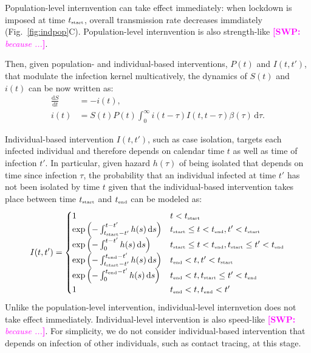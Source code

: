\documentclass[12pt]{article}
\newcommand{\comment}{\showcomment}
\newcommand{\showcomment}[3]{\textcolor{#1}{\textbf{[#2: }\textsl{#3}\textbf{]}}}
\newcommand{\swp}[1]{\comment{magenta}{SWP}{#1}}
\newcommand{\fref}[1]{Fig.~\ref{fig:#1}}
\newcommand{\tsub}[2]{#1_{{\textrm{\tiny #2}}}}
\newcommand{\dd}[1]{\ensuremath{\, \mathrm{d}#1}}
\newcommand{\dtau}{\dd{\tau}}
\newcommand{\tstart}{\ensuremath{\tsub{t}{start}}\xspace}
\newcommand{\tend}{\ensuremath{\tsub{t}{end}}\xspace}
\begin{document}
Population-level internvention can take effect immediately:
when lockdown is imposed at time \tstart, overall transmission rate decreases immdiately (\fref{indpop}C).
Population-level internvention is also strength-like \swp{because ...}.

Then, given population- and individual-based interventions, $P(t)$ and $I(t, t')$, that modulate the infection kernel multicatively, the dynamics of $S(t)$ and $i(t)$ can be now written as:
\begin{equation}
\begin{aligned}
\frac{\mathrm{d}S}{\mathrm{d}t} &= - i(t),\\
i(t) &= S(t) P(t) \int_0^\infty i(t-\tau) I(t,t-\tau) \beta(\tau) \dtau.
\end{aligned}
\end{equation}

Individual-based intervention $I(t, t')$, such as case isolation, targets each infected individual and therefore depends on calendar time $t$ as well as time of infection $t'$.
In particular, given hazard $h(\tau)$ of being isolated that depends on time since infection $\tau$, the probability that an individual infected at time $t'$ has not been isolated by time $t$ given that the individual-based intervention takes place between time \tstart and \tend can be modeled as:
\begin{equation}
I(t, t') = \begin{cases}
1 & t < \tstart\\
\exp\left(-\int_{\tstart-t'}^{t-t'} h(s) \dd{s}\right) & \tstart \leq t < \tend, t' < \tstart \\
\exp\left(-\int_{0}^{t-t'} h(s) \dd{s}\right) & \tstart \leq t < \tend, \tstart \leq t' < \tend\\
\exp\left(-\int_{\tstart-t'}^{\tend-t'} h(s) \dd{s}\right) & \tend < t, t' < \tstart \\
\exp\left(-\int_{0}^{\tend-t'} h(s) \dd{s}\right) & \tend < t, \tstart \leq t' < \tend\\
1 & \tend < t, \tend < t'
\end{cases}
\end{equation}
Unlike the population-level intervention, individual-level internvetion does not take effect immediately.
Individual-level intervention is also speed-like \swp{because ...}.
For simplicity, we do not consider individual-based intervention that depends on infection of other individuals, such as contact tracing, at this stage.
\end{document}
